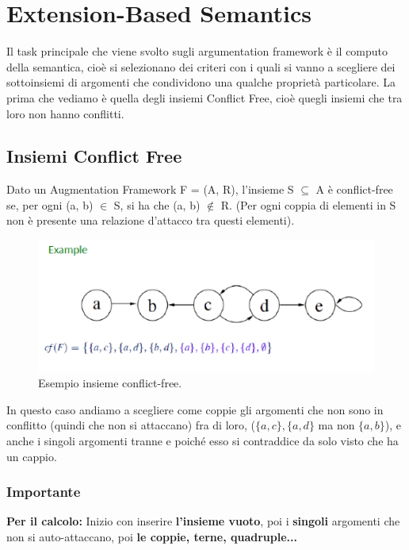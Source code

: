\section{Extension-Based Semantics}
Il task principale che viene svolto sugli argumentation framework è il computo
della semantica, cioè si selezionano dei criteri con i quali si vanno a
scegliere dei sottoinsiemi di argomenti che condividono una qualche proprietà
particolare. La prima che vediamo è quella degli insiemi Conflict Free, cioè
quegli insiemi che tra loro non hanno conflitti.
\subsection{Insiemi Conflict Free}
Dato un Augmentation Framework F = (A, R), l'insieme S $\subseteq$ A è
conflict-free se, per ogni (a, b) $\in$ S, si ha che (a, b) $\notin$ R. (Per
ogni coppia di elementi in S non è presente una relazione d'attacco tra questi
elementi).

\begin{figure}[H]
    \centering
    \includegraphics[width=12cm, keepaspectratio]{img/Cap6/cf.png}
    \caption{Esempio insieme conflict-free.}
\end{figure}

In questo caso andiamo a scegliere come coppie gli argomenti che non sono in
conflitto (quindi che non si attaccano) fra di loro, ($\{a,c\},\{a,d\}$ ma non $\{a,b\}$),
e anche i singoli argomenti tranne e poiché esso si contraddice da solo visto
che ha un cappio.

\subsubsection{\textbf{Importante}} \textbf{Per il calcolo:} Inizio con inserire
\textbf{l'insieme vuoto}, poi i \textbf{singoli} argomenti che non si
auto-attaccano, poi \textbf{le coppie, terne, quadruple...}

